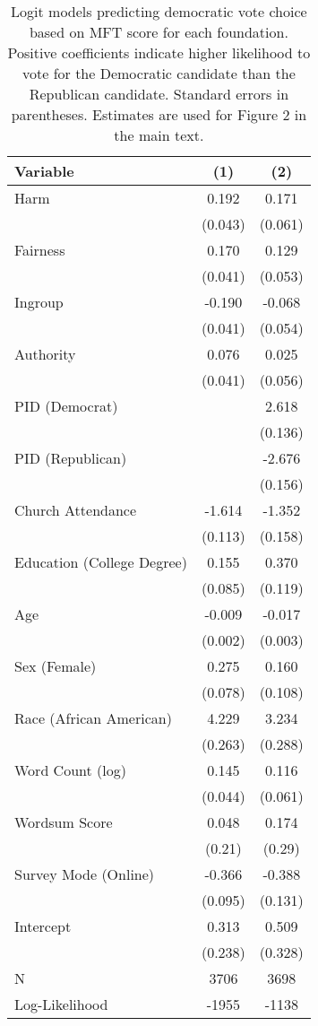 \begin{table}[ht]
\centering
\caption{Logit models predicting democratic vote choice based on
           MFT score for each foundation. Positive coefficients indicate higher likelihood
           to vote for the Democratic candidate than the Republican candidate. Standard errors 
           in parentheses. Estimates are used for Figure 2 in the main text.} 
\label{tab:logit_vote}
\begingroup\footnotesize
\begin{tabular}{lcc}
  \hline
Variable & (1) & (2) \\ 
  \hline
Harm &  0.192 &  0.171 \\ 
   & (0.043) & (0.061) \\ 
  Fairness &  0.170 &  0.129 \\ 
   & (0.041) & (0.053) \\ 
  Ingroup & -0.190 & -0.068 \\ 
   & (0.041) & (0.054) \\ 
  Authority &  0.076 &  0.025 \\ 
   & (0.041) & (0.056) \\ 
  PID (Democrat) &  &  2.618 \\ 
   &  & (0.136) \\ 
  PID (Republican) &  & -2.676 \\ 
   &  & (0.156) \\ 
  Church Attendance & -1.614 & -1.352 \\ 
   & (0.113) & (0.158) \\ 
  Education (College Degree) &  0.155 &  0.370 \\ 
   & (0.085) & (0.119) \\ 
  Age & -0.009 & -0.017 \\ 
   & (0.002) & (0.003) \\ 
  Sex (Female) &  0.275 &  0.160 \\ 
   & (0.078) & (0.108) \\ 
  Race (African American) &  4.229 &  3.234 \\ 
   & (0.263) & (0.288) \\ 
  Word Count (log) &  0.145 &  0.116 \\ 
   & (0.044) & (0.061) \\ 
  Wordsum Score &  0.048 &  0.174 \\ 
   & (0.21) & (0.29) \\ 
  Survey Mode (Online) & -0.366 & -0.388 \\ 
   & (0.095) & (0.131) \\ 
  Intercept &  0.313 &  0.509 \\ 
   & (0.238) & (0.328) \\ 
   \hline
N & 3706 & 3698 \\ 
  Log-Likelihood & -1955 & -1138 \\ 
   \hline
\end{tabular}
\endgroup
\end{table}
